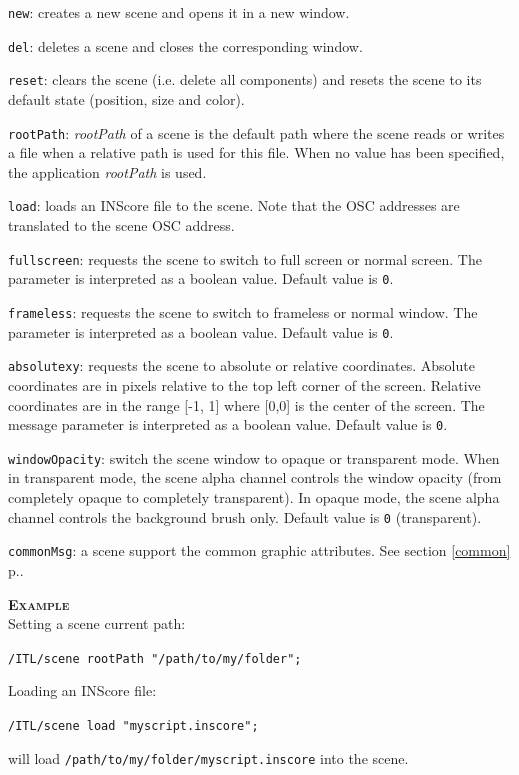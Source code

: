 \documentclass[a4paper,twoside]{report}
\newcommand{\fullref}[1]	{\ref{#1} p.\pageref{#1}}
\newcommand{\OSC}[1]		{\texttt{#1}}
\newcommand{\values}[1]		{\texttt{#1}}
\newcommand{\example}		{\textbf{\hspace{-1.5cm}\textbf{\textsc{Example }}}}
\let\olditemize\itemize
\let\oldenditemize\enditemize
\renewenvironment{itemize} 	{\olditemize \setlength{\itemsep}{1mm}}{\oldenditemize}
\newcommand{\sample}	[1]			{\vspace{-2mm}\begin{center}\colorbox{mygrey}{
								\begin{minipage}[t]{0.9\columnwidth} 
								{\small \texttt{#1}}
								\end{minipage}}\end{center}}
\newcommand{\sampleindent}	{ \hspace{0.5cm} }
\begin{document}
\begin{itemize}
\item \OSC{new}: creates a new scene and opens it in a new window.
\item \OSC{del}: deletes a scene and closes the corresponding window.
\item \OSC{reset}: clears the scene (i.e. delete all components) and resets the scene to its default state (position, size and color).
\item \OSC{rootPath}: \emph{rootPath} of a scene is the default path where the scene reads or writes a file when a relative path is used for this file. When no value has been specified, the application  \emph{rootPath} is used.
\item \OSC{load}: loads an INScore file to the scene. Note that the OSC addresses are translated to the scene OSC address.
\item \OSC{fullscreen}: requests the scene to switch to full screen or normal screen.  The parameter is interpreted as a boolean value. Default value is \values{0}.
\item \OSC{frameless}: requests the scene to switch to frameless or normal window.  The parameter is interpreted as a boolean value. Default value is \values{0}.
\item \OSC{absolutexy}: requests the scene to absolute or relative coordinates. Absolute coordinates are in pixels relative to the top left corner of the screen. Relative coordinates are in the range [-1, 1] where [0,0] is the center of the screen. The message parameter is interpreted as a boolean value. Default value is \values{0}.
\item \OSC{windowOpacity}: switch the scene window to opaque or transparent mode. When in transparent mode, the scene alpha channel controls the window opacity (from completely opaque to completely transparent). In opaque mode, the scene alpha channel controls the background brush only. Default value is \values{0} (transparent).
\item \OSC{commonMsg}: a scene support the common graphic attributes. See section \fullref{common}.
\end{itemize}

\example \\
Setting a scene current path:
\sample{/ITL/scene rootPath "/path/to/my/folder";}
Loading an INScore file:
\sample{/ITL/scene load "myscript.inscore";}
\sampleindent will load \OSC{/path/to/my/folder/myscript.inscore} into the scene. 
\end{document}
